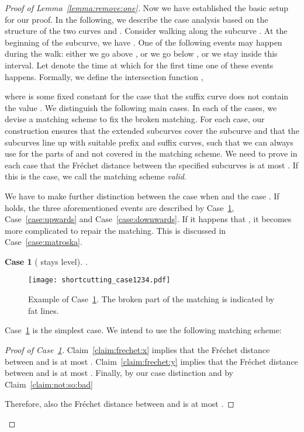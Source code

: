 \documentclass[11pt, letter]{article}
\newtheorem{case}[]{Case}
\newcommand{\lemref}[1]{Lemma~\ref{lemma:#1}}
\newcommand{\figlab}[1]{\label{fig:#1}}
\newcommand{\caselab}[1]{\label{case:#1}}
\newcommand{\caseref}[1]{Case~\ref{case:#1}}
\newcommand{\claimref}[1]{Claim~\ref{claim:#1}}
\newcommand{\Frechet}{Fr\'echet\xspace}
\begin{document}
\begin{proof}[Proof of \lemref{remove:one}]
Now we have established the basic setup for our proof. In the following, we
describe the case analysis based on the structure of the two curves  and
.  Consider walking along the
subcurve . At the beginning of the subcurve, we have .  One of the following events may happen
during the walk: either we go above , or we go below 
, or we stay inside this interval. Let  denote
the time at which for the first time one of these events happens. Formally,
we define the intersection function ,

where  is some fixed constant for the case that the suffix curve
 does not contain the value .
We distinguish the following main cases. In each of the cases, we devise a
matching scheme to fix the broken matching. For each case, our construction
ensures that the extended subcurves cover the subcurve 
and that the subcurves line up with suitable prefix and suffix curves, such that
we can always use  for the parts of  and  not covered in the matching
scheme. We need to prove in each case that the \Frechet distance between the
specified subcurves is at most . If this is the case, we call the
matching scheme \emph{valid}.

We have to make further distinction between the case when  and the case . If  holds, the three aforementioned events are described by \caseref{level}, \caseref{upwards} and \caseref{downwards}. If it happens that , it becomes more complicated to repair the matching. This is discussed in \caseref{matroska}.


\begin{case}[ stays level]
.
\caselab{level}
\end{case}
\begin{figure}[h]\centering
\texttt{[image: shortcutting\_case1234.pdf]}\\
\caption{Example of \caseref{level}. The broken part of the matching  is indicated by fat lines.}
\figlab{shortcutting:case2}
\end{figure}
\caseref{level} is the simplest case. We intend to use the following matching scheme:


\begin{proof}[Proof of \caseref{level}]
\claimref{frechet:x} implies that the \Frechet distance between 
and  is at most .
\claimref{frechet:y} implies that the \Frechet distance between 
and  is at most .
Finally, by our case distinction and by \claimref{not:so:bad}

Therefore, also the \Frechet distance between  and  is at most
.
\end{proof}


\end{proof}
\end{document}
